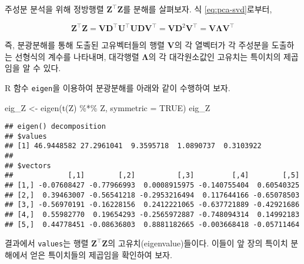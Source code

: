 \documentclass[
]{book}
\newenvironment{Shaded}{\begin{snugshade}}{\end{snugshade}}
\newcommand{\AttributeTok}[1]{\textcolor[rgb]{0.77,0.63,0.00}{#1}}
\newcommand{\ConstantTok}[1]{\textcolor[rgb]{0.00,0.00,0.00}{#1}}
\newcommand{\DecValTok}[1]{\textcolor[rgb]{0.00,0.00,0.81}{#1}}
\newcommand{\FunctionTok}[1]{\textcolor[rgb]{0.00,0.00,0.00}{#1}}
\newcommand{\NormalTok}[1]{#1}
\newcommand{\OtherTok}[1]{\textcolor[rgb]{0.56,0.35,0.01}{#1}}
\newcommand{\SpecialCharTok}[1]{\textcolor[rgb]{0.00,0.00,0.00}{#1}}
\begin{document}
주성분 분석을 위해 정방행렬 \(\mathbf{Z}^\top \mathbf{Z}\)를 분해를 살펴보자. 식 \eqref{eq:pca-svd}로부터,

\[
\mathbf{Z}^\top \mathbf{Z} = \mathbf{V} \mathbf{D}^\top \mathbf{U}^\top \mathbf{U} \mathbf{D} \mathbf{V}^\top = \mathbf{V} \mathbf{D}^2 \mathbf{V}^\top = \mathbf{V} \mathbf{\Lambda} \mathbf{V}^\top
\]

즉, 분광분해를 통해 도출된 고유벡터들의 행렬 \(\mathbf{V}\)의 각 열벡터가 각 주성분을 도출하는 선형식의 계수를 나타내며, 대각행렬 \(\mathbf{\Lambda}\)의 각 대각원소값인 고유치는 특이치의 제곱임을 알 수 있다.

R 함수 \texttt{eigen}을 이용하여 분광분해를 아래와 같이 수행하여 보자.

\begin{Shaded}
\begin{Highlighting}[]
\NormalTok{eig\_Z }\OtherTok{\textless{}{-}} \FunctionTok{eigen}\NormalTok{(}\FunctionTok{t}\NormalTok{(Z) }\SpecialCharTok{\%*\%}\NormalTok{ Z, }\AttributeTok{symmetric =} \ConstantTok{TRUE}\NormalTok{)}
\NormalTok{eig\_Z}
\end{Highlighting}
\end{Shaded}

\begin{verbatim}
## eigen() decomposition
## $values
## [1] 46.9448582 27.2961041  9.3595718  1.0890737  0.3103922
## 
## $vectors
##             [,1]        [,2]          [,3]         [,4]        [,5]
## [1,] -0.07608427 -0.77966993  0.0008915975 -0.140755404  0.60540325
## [2,]  0.39463007 -0.56541218 -0.2953216494  0.117644166 -0.65078503
## [3,] -0.56970191 -0.16228156  0.2412221065 -0.637721889 -0.42921686
## [4,]  0.55982770  0.19654293 -0.2565972887 -0.748094314  0.14992183
## [5,]  0.44778451 -0.08636803  0.8881182665 -0.003668418 -0.05711464
\end{verbatim}

결과에서 \texttt{values}는 행렬 \(\mathbf{Z}^\top \mathbf{Z}\)의 고유치(eigenvalue)들이다. 이들이 앞 장의 특이치 분해에서 얻은 특이치들의 제곱임을 확인하여 보자.

\begin{Shaded}
\end{Shaded}
\end{document}

